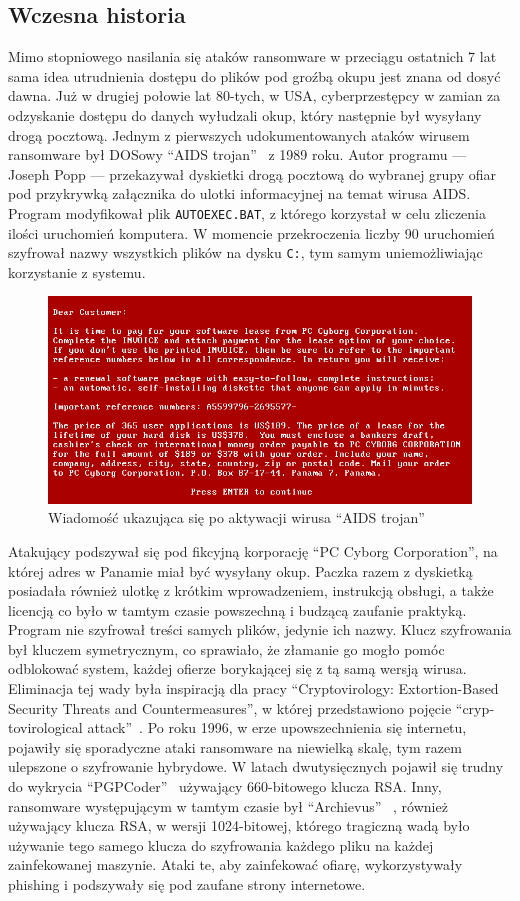 \subsection{Wczesna historia}
Mimo stopniowego nasilania się ataków ransomware w przeciągu ostatnich 7 lat sama idea utrudnienia
dostępu do plików pod groźbą okupu jest znana od dosyć dawna. Już w drugiej połowie lat 80-tych, w USA,
cyberprzestępcy w zamian za odzyskanie dostępu do danych wyłudzali okup, który następnie był wysyłany drogą pocztową. Jednym z pierwszych udokumentowanych ataków wirusem ransomware był DOSowy \foreignquote{english}{AIDS trojan}~\cite{virus_1990} z 1989 roku. Autor programu — Joseph Popp — przekazywał dyskietki drogą pocztową do wybranej grupy ofiar pod przykrywką załącznika do ulotki informacyjnej na temat wirusa AIDS. Program modyfikował plik \texttt{AUTOEXEC.BAT}, z którego korzystał w celu zliczenia ilości uruchomień komputera. W momencie przekroczenia liczby 90 uruchomień szyfrował nazwy wszystkich plików na dysku \texttt{C:\/}, tym samym uniemożliwiając korzystanie z systemu.
\begin{figure}[H]
    \centering
    \includegraphics[width=0.6\linewidth]{rysunki/aids-trojan.png}
    \caption{Wiadomość ukazująca się po aktywacji wirusa \foreignquote{english}{AIDS trojan}}
    \label{fig:enter-label}
\end{figure}
Atakujący podszywał się pod fikcyjną korporację \foreignquote{english}{PC Cyborg Corporation}, na której adres w Panamie miał być wysyłany okup. Paczka razem z dyskietką posiadała również ulotkę z krótkim wprowadzeniem, instrukcją obsługi, a także licencją co było w tamtym czasie powszechną i budzącą zaufanie praktyką. 
Program nie szyfrował treści samych plików, jedynie ich nazwy. Klucz szyfrowania był kluczem symetrycznym, co sprawiało, że złamanie go mogło pomóc odblokować system, każdej ofierze borykającej się z tą samą wersją wirusa. Eliminacja tej wady była inspiracją dla pracy \foreignquote{english}{Cryptovirology: Extortion-Based Security Threats and Countermeasures}, w której przedstawiono pojęcie \foreignquote{english}{cryptovirological attack}~\cite{yung}.
\newline
Po roku 1996, w erze upowszechnienia się internetu, pojawiły się sporadyczne ataki ransomware na niewielką skalę, tym razem ulepszone o szyfrowanie hybrydowe. W latach dwutysięcznych pojawił się trudny do wykrycia \foreignquote{english}{PGPCoder}~\cite{tromer_cryptanalysis_nodate} używający 660-bitowego klucza RSA. Inny, ransomware występującym w tamtym czasie był \foreignquote{english}{Archievus} ~\cite{arhiveus}, również używający klucza RSA, w wersji 1024-bitowej, którego tragiczną wadą było używanie tego samego klucza do szyfrowania każdego pliku na każdej zainfekowanej maszynie. Ataki te, aby zainfekować ofiarę, wykorzystywały phishing i podszywały się pod zaufane strony internetowe. 
